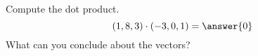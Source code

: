 \begin{problem}
Compute the dot product.
\[
(1,8,3)\cdot(-3,0,1)=\answer{0}
\]
What can you conclude about the vectors?
\begin{multipleChoice}
\end{multipleChoice}
\end{problem}